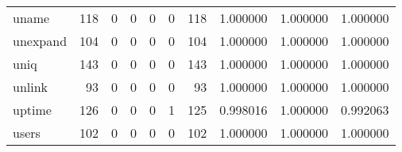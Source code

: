 \begin{tabular}{lrrrrrrrrr}
uname     &                                                118 &                                                  0 &                                                  0 &                                                  0 &                                                  0 &                                                118 &                                           1.000000 &                               1.000000 &                             1.000000 \\
unexpand  &                                                104 &                                                  0 &                                                  0 &                                                  0 &                                                  0 &                                                104 &                                           1.000000 &                               1.000000 &                             1.000000 \\
uniq      &                                                143 &                                                  0 &                                                  0 &                                                  0 &                                                  0 &                                                143 &                                           1.000000 &                               1.000000 &                             1.000000 \\
unlink    &                                                 93 &                                                  0 &                                                  0 &                                                  0 &                                                  0 &                                                 93 &                                           1.000000 &                               1.000000 &                             1.000000 \\
uptime    &                                                126 &                                                  0 &                                                  0 &                                                  0 &                                                  1 &                                                125 &                                           0.998016 &                               1.000000 &                             0.992063 \\
users     &                                                102 &                                                  0 &                                                  0 &                                                  0 &                                                  0 &                                                102 &                                           1.000000 &                               1.000000 &                             1.000000 \\

\end{tabular}
